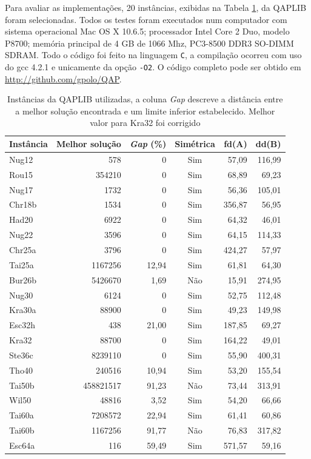 Para avaliar as implementações, 20 instâncias, exibidas na Tabela
\ref{qapinst}, da QAPLIB \cite{qaplib} foram selecionadas. Todos os
testes foram executados num computador com sistema operacional Mac OS
X 10.6.5; processador Intel Core 2 Duo, modelo P8700; memória
principal de 4 GB de 1066 Mhz, PC3-8500 DDR3 SO-DIMM SDRAM. Todo o
código foi feito na linguagem \texttt{C}, a compilação ocorreu com uso
do gcc 4.2.1 e unicamente da opção \verb!-O2!. O código completo pode
ser obtido em \url{http://github.com/gpolo/QAP}.

\begin{table}[H]
  \caption{Instâncias da QAPLIB utilizadas\label{qapinst},
 a coluna
\textit{Gap} descreve a distância entre a melhor solução encontrada e
um limite inferior estabelecido. Melhor valor para Kra32 foi corrigido}
  \centering
  \begin{tabular}{l r r c r r}
    \toprule
    Instância & Melhor solução & \textit{Gap} (\%) & Simétrica & fd(A) & dd(B)\\
    \midrule
    Nug12 & 578 & 0 & Sim & 57,09 & 116,99\\
    Rou15 & 354210 & 0 & Sim & 68,89 & 69,23 \\
    Nug17 & 1732 & 0 & Sim & 56,36 & 105,01 \\
    Chr18b & 1534 & 0 & Sim & 356,87 & 56,95 \\
    Had20 & 6922 & 0 & Sim & 64,32 & 46,01 \\
    Nug22 & 3596 & 0 & Sim & 64,15 & 114,33\\
    Chr25a & 3796 & 0 & Sim & 424,27 & 57,97 \\
    Tai25a & 1167256 & 12,94 & Sim & 61,81 & 64,30\\
    Bur26b & 5426670 & 1,69 & Não & 15,91 & 274,95 \\
    Nug30 & 6124 & 0 & Sim & 52,75 & 112,48 \\
    Kra30a & 88900 & 0 & Sim & 49,23 & 149,98 \\
    Esc32h & 438 & 21,00 & Sim & 187,85 & 69,27 \\
    Kra32  & 88700 & 0 & Sim & 164,22 & 49,01 \\
    Ste36c & 8239110 & 0 & Sim & 55,90 & 400,31 \\
    Tho40 & 240516 & 10,94 & Sim & 53,20 & 155,54 \\
    Tai50b & 458821517 & 91,23 & Não & 73,44 & 313,91 \\
    Wil50 & 48816 & 3,52 & Sim & 54,20 & 66,66 \\
    Tai60a & 7208572 & 22,94 & Sim & 61,41 & 60,86 \\
    Tai60b & 1167256 & 91,77 & Não & 76,83 & 317,82 \\
    Esc64a & 116 & 59,49 & Sim & 571,57 & 59,16 \\
    \bottomrule
  \end{tabular}
\end{table}

